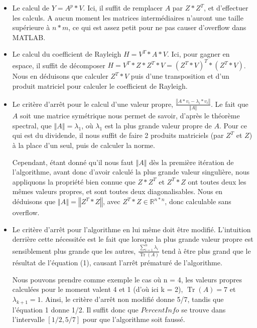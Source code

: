\documentclass[a4paper,12pt]{article}
\DeclareMathOperator{\Tr}{Tr}
\newcommand{\norme}[1]{\left\Vert #1\right\Vert}
\begin{document}
        \begin{itemize}
        \item Le calcul de $Y = A^p*V$. Ici, il suffit de remplacer $A$ par
            $Z*Z^T$, et d'effectuer les calculs. A aucun moment les matrices
            intermédiaires n'auront une taille supérieure à $n*m$, ce qui est
            assez petit pour ne pas causer d'overflow dans MATLAB.

        \item Le calcul du coefficient de Rayleigh $H = V^T*A*V$. Ici, pour
            gagner en espace, il suffit de décomposer $H = V^T*Z*Z^T*V =
            (Z^T*V)^T*(Z^T*V)$. Nous en déduisons que calculer $Z^T*V$ puis
            d'une transposition et d'un produit matriciel pour calculer le
            coefficient de Rayleigh.

        \item Le critère d'arrêt pour le calcul d'une valeur propre,
            $\displaystyle \frac{\norme{A*v_i - \lambda_i*v_i}}{\norme{A}}$.
            Le fait que $A$ soit une matrice symétrique nous permet de savoir,
            d'après le théorème spectral, que $\norme{A} = \lambda_1$, où
            $\lambda_1$ est la plus grande valeur propre de $A$. Pour ce qui est
            du dividende, il nous suffit de faire 2 produits matriciels (par
            $Z^T$ et $Z$) à la place d'un seul, puis de calculer la norme.

            Cependant, étant donné qu'il nous faut $\norme{A}$ dès la première
            itération de l'algorithme, avant donc d'avoir calculé la plus grande
            valeur singulière, nous appliquons la propriété bien connue que
            $Z*Z^T$ et $Z^T*Z$ ont toutes deux les mêmes valeurs propres, et
            sont toutes deux diagonalisables. Nous en déduisons que $\norme{A} =
            \norme{Z^T*Z}$, avec $Z^T*Z \in \mathbb{R}^{n*n}$, donc calculable
            sans overflow.

        \item Le critère d'arrêt pour l'algorithme en lui même doit être
            modifié. L'intuition derrière cette nécessitée est le fait que
            lorsque la plus grande valeur propre est sensiblement plus
            grande que les autres,
            $\displaystyle \frac{\sum\limits_{i=1}^n \lambda_i}{\Tr(A)}$
            tend à être plus grand que le résultat de l'équation (1), causant
            l'arrêt prématuré de l'algorithme.

            Nous pouvons prendre comme exemple le cas où n = 4, les valeurs
            propres calculées pour le moment valent 4 et 1 (d'où ici k = 2),
            $\Tr(A) = 7$ et $\lambda_{k+1} = 1$. Ainsi, le critère d'arrêt non
            modifié donne 5/7, tandis que l'équation 1 donne 1/2. Il suffit donc
            que $PercentInfo$ se trouve dans l'intervalle $[1/2,5/7]$ pour que
            l'algorithme soit faussé.


\end{itemize}
\end{document}
